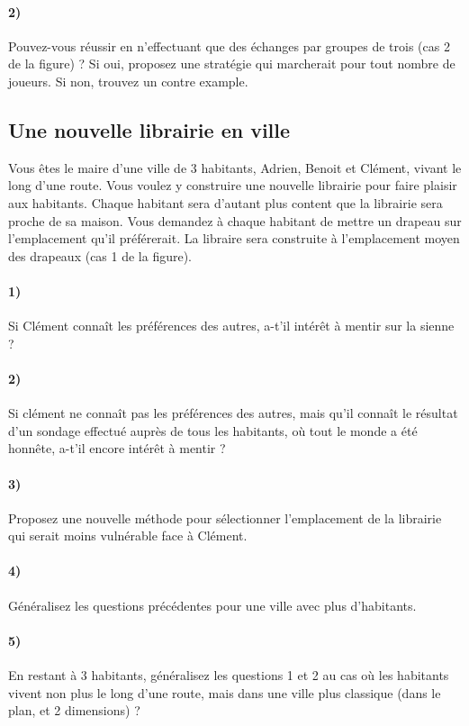 \documentclass[a4paper,10pt,oneside]{article}
\begin{document}
\paragraph*{2)} 
Pouvez-vous réussir en n'effectuant que des échanges par groupes de trois (cas 2 de la figure) ?
Si oui, proposez une stratégie qui marcherait pour tout nombre de joueurs.
Si non, trouvez un contre example.




\subsection{Une nouvelle librairie en ville}


Vous êtes le maire d'une ville de 3 habitants, Adrien, Benoit et Clément,  vivant le long d'une route.
Vous voulez y construire une nouvelle librairie pour faire plaisir aux habitants.
Chaque habitant sera d'autant plus content que la librairie sera proche de sa maison. 
Vous demandez à chaque habitant de mettre un drapeau sur l'emplacement qu'il préférerait.
La libraire sera construite à l'emplacement moyen des drapeaux (cas 1 de la figure).

\paragraph*{1)} 
Si Clément connaît les préférences des autres, a-t'il intérêt à mentir sur la sienne ?

\paragraph*{2)} 
Si clément ne connaît pas les préférences des autres, mais qu'il connaît le résultat d'un sondage effectué auprès de tous les habitants, où tout le monde a été honnête, a-t'il encore intérêt à mentir ?

\paragraph*{3)} 
Proposez une nouvelle méthode pour sélectionner l'emplacement de la librairie qui serait moins vulnérable face à Clément.

\paragraph*{4)} 
Généralisez les questions précédentes pour une ville avec plus d'habitants.

\paragraph*{5)} 
En restant à 3 habitants, généralisez les questions 1 et 2 au cas où les habitants vivent non plus le long d'une route, mais dans une ville plus classique (dans le plan, et 2 dimensions) ? 
\end{document}

